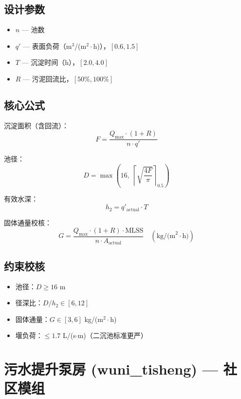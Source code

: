 \documentclass[12pt,a4paper]{ctexart}
\begin{document}
\subsection{设计参数}
\begin{itemize}
  \item $n$ — 池数
  \item $q'$ — 表面负荷（m$^3$/(m$^2\cdot$h)），$[0.6, 1.5]$
  \item $T$ — 沉淀时间（h），$[2.0, 4.0]$
  \item $R$ — 污泥回流比，$[50\%, 100\%]$
\end{itemize}

\subsection{核心公式}
沉淀面积（含回流）：
\begin{equation}
F = \frac{Q_{\text{max}} \cdot (1 + R)}{n \cdot q'}
\end{equation}

池径：
\begin{equation}
D = \max\left(16,\; \left\lceil \sqrt{\frac{4F}{\pi}} \right\rceil_{0.5}\right)
\end{equation}

有效水深：
\begin{equation}
h_2 = q'_{\text{actual}} \cdot T
\end{equation}

固体通量校核：
\begin{equation}
G = \frac{Q_{\text{max}} \cdot (1 + R) \cdot \text{MLSS}}{n \cdot A_{\text{actual}}} \quad (\text{kg/(m}^2\cdot\text{h)})
\end{equation}

\subsection{约束校核}
\begin{itemize}
  \item 池径：$D \ge 16$ m
  \item 径深比：$D/h_2 \in [6, 12]$
  \item 固体通量：$G \in [3, 6]$ kg/(m$^2\cdot$h)
  \item 堰负荷：$\le 1.7$ L/(s$\cdot$m)（二沉池标准更严）
\end{itemize}

\section{污水提升泵房 (wuni\_tisheng) — 社区模组}
\end{document}
